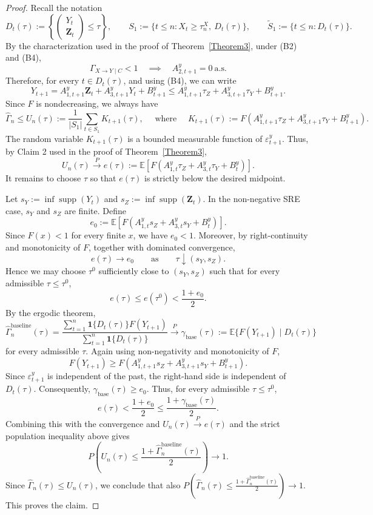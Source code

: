 \documentclass[10pt,a4paper]{amsart}
\begin{document}
\begin{proof}
Recall the notation
\[
D_t(\tau):=\left\{\begin{pmatrix}Y_t\\ \mathbf Z_t\end{pmatrix}\le \tau\right\},
\qquad
S_1:=\{t\le n:X_t\ge \tau_n^X,\ D_t(\tau)\},
\qquad
\widetilde S_1:=\{t\le n:D_t(\tau)\}.
\]
By the characterization used in the proof of Theorem~\ref{Theorem3}, under
(B2) and (B4),
\[
\Gamma_{X\to Y\mid C}<1
\quad\implies \quad
A^y_{2,t+1}=0 \ \text{a.s.}
\]
Therefore, for every  \(t\in D_t(\tau)\), and using (B4), we can write
\[
Y_{t+1}=A^y_{1,t+1}\mathbf Z_t+A^y_{3,t+1}Y_t+B^y_{t+1}\le
A^y_{1,t+1}\tau_Z+A^y_{3,t+1}\tau_Y+B^y_{t+1}.
\]
Since \(F\) is nondecreasing, we always have
\[
\widehat\Gamma_n
\le
U_n(\tau)
:=
\frac1{|S_1|}\sum_{t\in S_1}
K_{t+1}(\tau), \quad \text{ where } \quad K_{t+1}(\tau)
:=
F\!\left(
A^y_{1,t+1}\tau_Z+A^y_{3,t+1}\tau_Y+B^y_{t+1}
\right).
\]
The random variable \(K_{t+1}(\tau)\) is a bounded measurable function of
\(\varepsilon^y_{t+1}\). Thus, by Claim 2 used in the
proof of Theorem~\ref{Theorem3},
\[
U_n(\tau)\overset{P}{\longrightarrow}
e(\tau)
:=
\mathbb E\!\left[
F\!\left(
A^y_{1,t}\tau_Z+A^y_{3,t}\tau_Y+B^y_t
\right)
\right].
\]
It remains to choose \(\tau\) so that \(e(\tau)\) is strictly below the desired midpoint. 

Let \(s_Y:=\inf\operatorname{supp}(Y_t)\) and
\(s_Z:=\inf\operatorname{supp}(\mathbf Z_t)\). In the non-negative SRE case,
\(s_Y\) and \(s_Z\) are finite. Define
\[
e_0
:=
\mathbb E\!\left[
F\!\left(
A^y_{1,t}s_Z+A^y_{3,t}s_Y+B^y_t
\right)
\right].
\]
Since \(F(x)<1\) for every finite \(x\), we have \(e_0<1\). Moreover, by
right-continuity and monotonicity of \(F\), together with dominated convergence,
\[
e(\tau)\longrightarrow e_0
\qquad\text{as}\qquad
\tau\downarrow (s_Y,s_Z).
\]
Hence we may choose \(\tau^0\) sufficiently close to \((s_Y,s_Z)\) such that for every admissible
\(\tau\le \tau^0\),
\[
e(\tau)\le e(\tau^0)<\frac{1+e_0}{2}.
\]
By the ergodic theorem,
\[
\widehat\Gamma^{\mathrm{baseline}}_n(\tau)
=
\frac{\sum_{t=1}^n \mathbf 1\{D_t(\tau)\}F(Y_{t+1})}
     {\sum_{t=1}^n \mathbf 1\{D_t(\tau)\}}
\overset{P}{\longrightarrow}
\gamma_{\mathrm{base}}(\tau):=
\mathbb E\{F(Y_{t+1})\mid D_t(\tau)\}
\]
for every admissible \(\tau\). Again using non-negativity and monotonicity of \(F\),
\[
F(Y_{t+1})
\ge
F\!\left(
A^y_{1,t+1}s_Z+A^y_{3,t+1}s_Y+B^y_{t+1}
\right).
\]
Since \(\varepsilon^y_{t+1}\) is independent of the past, the right-hand side is
independent of \(D_t(\tau)\). Consequently, \(
\gamma_{\mathrm{base}}(\tau)\ge e_0.
\) Thus, for every admissible \(\tau\le\tau^0\),
\[
e(\tau)
<
\frac{1+e_0}{2}
\le
\frac{1+\gamma_{\mathrm{base}}(\tau)}{2}.
\]
Combining this with the convergence and
\(U_n(\tau)\overset{P}{\to}e(\tau)\) and the strict population inequality above gives
\[
P\left(
U_n(\tau)\le
\frac{1+\widehat\Gamma^{\mathrm{baseline}}_n(\tau)}{2}
\right)\to 1.
\]
Since \(\widehat\Gamma_n(\tau)\le U_n(\tau)\), we conclude that also
\(
P\left(
\widehat\Gamma_n(\tau)
\le
\frac{1+\widehat\Gamma^{\mathrm{baseline}}_n(\tau)}{2}
\right)\to 1.
\)
This proves the claim.
\end{proof}
\end{document}
